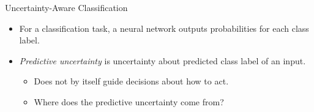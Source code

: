 \begin{frame}[t]{Uncertainty-Aware Classification}
\label{frm:classification-uncertainty}
\begin{itemize}
\setlength{\itemsep}{3mm}
\item For a classification task, a neural network outputs probabilities for each class label.
\end{itemize}
\vspace{1mm}
{\centering
\par}
\begin{itemize}
    \vspace{1mm}
\item<2-> \emph{Predictive uncertainty} is uncertainty about predicted class label of an input.
\begin{itemize}
\vspace{1mm}
\item Does not by itself guide decisions about how to act.
\item Where does the predictive uncertainty come from?
\end{itemize}
\end{itemize}
\end{frame}

